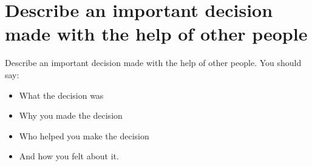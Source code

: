 \section{Describe an important decision made with the help of other people}
\begin{ieltsprompt}
Describe an important decision made with the help of other people.
You should say:
\begin{itemize}[leftmargin=2em, itemsep=2pt]
\item What the decision was
\item Why you made the decision
\item Who helped you make the decision
\item And how you felt about it.
\end{itemize}
\end{ieltsprompt}

